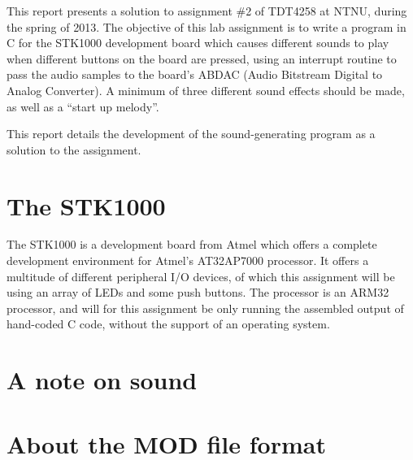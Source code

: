 This report presents a solution to assignment \#2 of TDT4258 at NTNU, during the spring of 2013.
The objective of this lab assignment is to write a program in C for the STK1000 development board which causes different sounds to play when different buttons on the board are pressed, using an interrupt routine to pass the audio samples to the board's ABDAC (Audio Bitstream Digital to Analog Converter).
A minimum of three different sound effects should be made, as well as a ``start up melody''.

This report details the development of the sound-generating program as a solution to the assignment.
\section{The STK1000}
	The STK1000 is a development board from Atmel which offers a complete development environment for Atmel's AT32AP7000 processor.
	It offers a multitude of different peripheral I/O devices, of which this assignment will be using an array of LEDs and some push buttons.
	The processor is an ARM32 processor, and will for this assignment be only running the assembled output of hand-coded C code, without the support of an operating system.

\section{A note on sound}
	


\section{About the MOD file format}
	